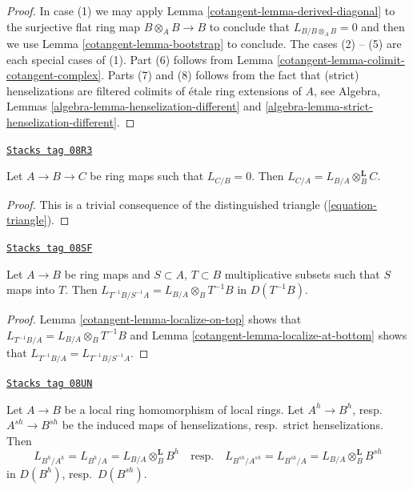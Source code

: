 \begin{proof}

In case (1) we may apply
Lemma \ref{cotangent-lemma-derived-diagonal}
to the surjective flat ring map $B \otimes_A B \to B$
to conclude that $L_{B/B \otimes_A B} = 0$ and then we use
Lemma \ref{cotangent-lemma-bootstrap}
to conclude. The cases (2) -- (5) are each special cases of (1).
Part (6) follows from Lemma \ref{cotangent-lemma-colimit-cotangent-complex}.
Parts (7) and (8) follows from the fact that (strict) henselizations
are filtered colimits of \'etale ring extensions of $A$, see
Algebra, Lemmas \ref{algebra-lemma-henselization-different} and
\ref{algebra-lemma-strict-henselization-different}.
\end{proof}

\begin{lemma}
\label{cotangent-lemma-localize-on-top}
\href{https://stacks.math.columbia.edu/tag/08R3}{\texttt{Stacks tag 08R3}}

Let $A \to B \to C$ be ring maps such that $L_{C/B} = 0$.
Then $L_{C/A} = L_{B/A} \otimes_B^\mathbf{L} C$.
\end{lemma}

\begin{proof}
This is a trivial consequence of
the distinguished triangle (\ref{equation-triangle}).
\end{proof}

\begin{lemma}[Localize]
\label{cotangent-lemma-localize}
\href{https://stacks.math.columbia.edu/tag/08SF}{\texttt{Stacks tag 08SF}}

Let $A \to B$ be ring maps and $S \subset A$, $T \subset B$ multiplicative
subsets such that $S$ maps into $T$.
Then $L_{T^{-1}B/S^{-1}A} = L_{B/A} \otimes_B T^{-1}B$
in $D(T^{-1}B)$.
\end{lemma}

\begin{proof}

Lemma \ref{cotangent-lemma-localize-on-top} shows that
$L_{T^{-1}B/A} = L_{B/A} \otimes_B T^{-1}B$
and Lemma \ref{cotangent-lemma-localize-at-bottom}
shows that $L_{T^{-1}B/A} = L_{T^{-1}B/S^{-1}A}$.
\end{proof}

\begin{lemma}
\label{cotangent-lemma-cotangent-complex-henselization}
\href{https://stacks.math.columbia.edu/tag/08UN}{\texttt{Stacks tag 08UN}}

Let $A \to B$ be a local ring homomorphism of local rings.
Let $A^h \to B^h$, resp.\ $A^{sh} \to B^{sh}$ be the induced
maps of henselizations, resp.\ strict henselizations.
Then
$$
L_{B^h/A^h} = L_{B^h/A} = L_{B/A} \otimes_B^\mathbf{L} B^h
\quad\text{resp.}\quad
L_{B^{sh}/A^{sh}} = L_{B^{sh}/A} = L_{B/A} \otimes_B^\mathbf{L} B^{sh}
$$
in $D(B^h)$, resp.\ $D(B^{sh})$.
\end{lemma}

